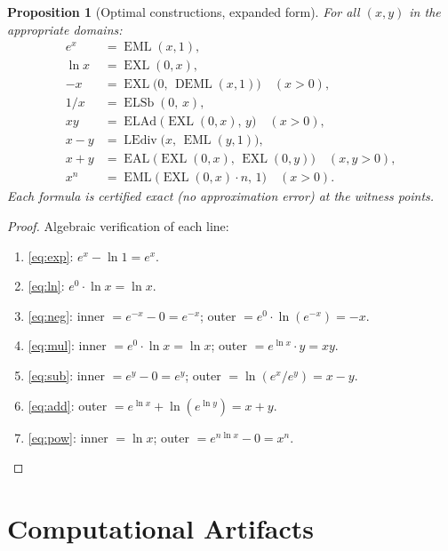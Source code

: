 \documentclass[12pt,a4paper]{article}
\newtheorem{proposition}[theorem]{Proposition}
\theoremstyle{definition}
\newcommand{\EML}{\operatorname{EML}}
\newcommand{\EXL}{\operatorname{EXL}}
\newcommand{\EAL}{\operatorname{EAL}}
\newcommand{\DEML}{\operatorname{DEML}}
\newcommand{\ELAd}{\operatorname{ELAd}}
\newcommand{\ELSb}{\operatorname{ELSb}}
\newcommand{\LEdiv}{\operatorname{LEdiv}}
\begin{document}
\begin{proposition}[Optimal constructions, expanded form]\label{prop:constructions}
For all $(x,y)$ in the appropriate domains:
\begin{align}
  e^x &= \EML(x,1), \label{eq:exp} \\
  \ln x &= \EXL(0,x), \label{eq:ln} \\
  -x &= \EXL\!\bigl(0,\,\DEML(x,1)\bigr) \quad (x>0), \label{eq:neg} \\
  1/x &= \ELSb(0,\,x), \label{eq:recip} \\
  xy &= \ELAd\!\bigl(\EXL(0,x),\,y\bigr)  \quad (x>0), \label{eq:mul} \\
  x-y &= \LEdiv\!\bigl(x,\,\EML(y,1)\bigr), \label{eq:sub} \\
  x+y &= \EAL\!\bigl(\EXL(0,x),\,\EXL(0,y)\bigr)  \quad (x,y>0), \label{eq:add} \\
  x^n &= \EML\!\bigl(\EXL(0,x)\cdot n,\,1\bigr)  \quad (x>0). \label{eq:pow}
\end{align}
Each formula is certified exact (no approximation error) at the witness points.
\end{proposition}

\begin{proof}
Algebraic verification of each line:
\begin{enumerate}
  \item \eqref{eq:exp}: $e^x - \ln 1 = e^x$. \checkmark
  \item \eqref{eq:ln}: $e^0\cdot\ln x = \ln x$. \checkmark
  \item \eqref{eq:neg}: inner $= e^{-x}-0=e^{-x}$; outer $=e^0\cdot\ln(e^{-x})=-x$. \checkmark
  \item \eqref{eq:mul}: inner $= e^0\cdot\ln x = \ln x$; outer $= e^{\ln x}\cdot y = xy$. \checkmark
  \item \eqref{eq:sub}: inner $= e^y - 0 = e^y$; outer $= \ln(e^x/e^y)=x-y$. \checkmark
  \item \eqref{eq:add}: outer $= e^{\ln x}+\ln(e^{\ln y}) = x + y$. \checkmark
  \item \eqref{eq:pow}: inner $= \ln x$; outer $= e^{n\ln x}-0 = x^n$. \checkmark
\end{enumerate}
\end{proof}

\section*{Computational Artifacts}
\end{document}
